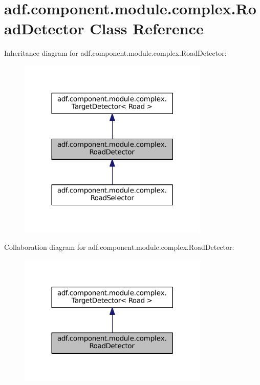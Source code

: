 \hypertarget{classadf_1_1component_1_1module_1_1complex_1_1RoadDetector}{}\section{adf.\+component.\+module.\+complex.\+Road\+Detector Class Reference}
\label{classadf_1_1component_1_1module_1_1complex_1_1RoadDetector}


Inheritance diagram for adf.\+component.\+module.\+complex.\+Road\+Detector\+:
\nopagebreak
\begin{figure}[H]
\begin{center}
\leavevmode
\includegraphics[width=257pt]{classadf_1_1component_1_1module_1_1complex_1_1RoadDetector__inherit__graph}
\end{center}
\end{figure}


Collaboration diagram for adf.\+component.\+module.\+complex.\+Road\+Detector\+:
\nopagebreak
\begin{figure}[H]
\begin{center}
\leavevmode
\includegraphics[width=257pt]{classadf_1_1component_1_1module_1_1complex_1_1RoadDetector__coll__graph}
\end{center}
\end{figure}
